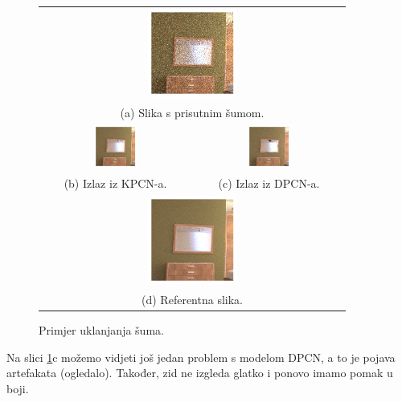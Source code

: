 \documentclass[times, utf8, seminar, numeric]{fer}
\begin{document}
\begin{figure}[H]
  \centering
\begin{tabular}{cc}
  \multicolumn{2}{c}{\includegraphics[width=0.3\textwidth]{eval3_in.png}} \\
  \multicolumn{2}{c}{(a) Slika s prisutnim šumom.} \\[6pt]
  \includegraphics[width=0.3\textwidth]{eval3_kpcn.png} & \includegraphics[width=0.3\textwidth]{eval3_dpcn.png} \\
  (b) Izlaz iz KPCN-a. & (c) Izlaz iz DPCN-a. \\[6pt]
  \multicolumn{2}{c}{\includegraphics[width=0.3\textwidth]{eval3_ref.png}} \\
  \multicolumn{2}{c}{(d) Referentna slika.} \\[6pt]
\end{tabular}
\caption{Primjer uklanjanja šuma.}
\label{fig:eval3}
\end{figure}
Na slici \ref{fig:eval3}c možemo vidjeti još jedan problem s modelom DPCN, a to je pojava
artefakata (ogledalo). Također, zid ne izgleda glatko i ponovo imamo pomak u boji.
\end{document}
